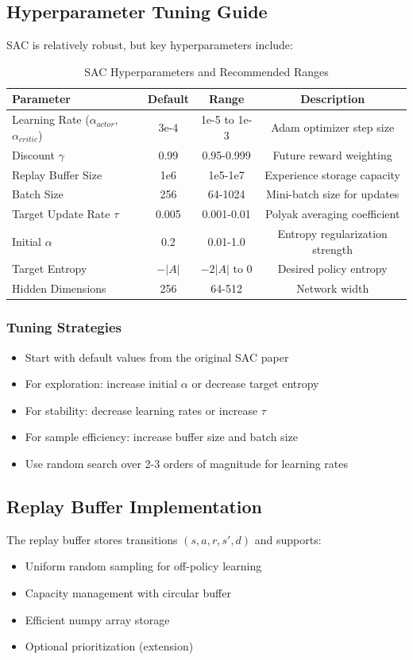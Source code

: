 \documentclass[11pt,a4paper]{article}
\begin{document}
\subsection{Hyperparameter Tuning Guide}
SAC is relatively robust, but key hyperparameters include:

\begin{table}[H]
\centering
\caption{SAC Hyperparameters and Recommended Ranges}
\begin{tabular}{lccc}
\toprule
Parameter & Default & Range & Description \\
\midrule
Learning Rate ($\alpha_{actor}$, $\alpha_{critic}$) & 3e-4 & 1e-5 to 1e-3 & Adam optimizer step size \\
Discount $\gamma$ & 0.99 & 0.95-0.999 & Future reward weighting \\
Replay Buffer Size & 1e6 & 1e5-1e7 & Experience storage capacity \\
Batch Size & 256 & 64-1024 & Mini-batch size for updates \\
Target Update Rate $\tau$ & 0.005 & 0.001-0.01 & Polyak averaging coefficient \\
Initial $\alpha$ & 0.2 & 0.01-1.0 & Entropy regularization strength \\
Target Entropy & $-|A|$ & $-2|A|$ to 0 & Desired policy entropy \\
Hidden Dimensions & 256 & 64-512 & Network width \\
\bottomrule
\end{tabular}
\end{table}

\subsubsection{Tuning Strategies}
\begin{itemize}
  \item Start with default values from the original SAC paper
  \item For exploration: increase initial $\alpha$ or decrease target entropy
  \item For stability: decrease learning rates or increase $\tau$
  \item For sample efficiency: increase buffer size and batch size
  \item Use random search over 2-3 orders of magnitude for learning rates
\end{itemize}

\subsection{Replay Buffer Implementation}
The replay buffer stores transitions $(s, a, r, s', d)$ and supports:
\begin{itemize}
  \item Uniform random sampling for off-policy learning
  \item Capacity management with circular buffer
  \item Efficient numpy array storage
  \item Optional prioritization (extension)
\end{itemize}
\end{document}
